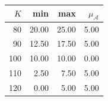\begin{tabular}{rrrr}\toprule $K$ & min & max & $\mu_{\mathcal A}$\\\midrule
80 & 20.00 & 25.00 & 5.00\\
90 & 12.50 & 17.50 & 5.00\\
100 & 10.00 & 10.00 & 0.00\\
110 & 2.50 & 7.50 & 5.00\\
120 & 0.00 & 5.00 & 5.00\\
\bottomrule\end{tabular}

